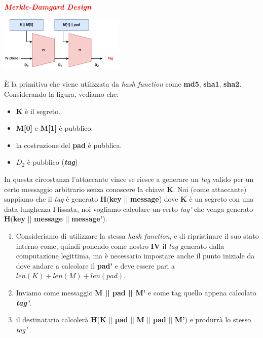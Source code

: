 \begin{boxA}
    \textcolor{red}{\textbf{\textit{Merkle-Damgard Design}}} \\

    {\centering
        \includegraphics[width=0.45\textwidth]{img/hash_md.png}
    \par}

    È la primitiva che viene utilizzata da \textit{hash function} come \textbf{md5}, \textbf{sha1}, \textbf{sha2}. Considerando la figura, vediamo che:
    \begin{itemize}[nosep]
        \item \textbf{K} è il segreto.
        \item \textbf{M[0]} e \textbf{M[1]} è pubblico.
        \item la costruzione del \textbf{pad} è pubblica.
        \item $D_2$ è pubblico (\textbf{\textit{tag}})
    \end{itemize}
    In questa circostanza l'attaccante vince se riesce a generare un \textit{tag} valido per un certo messaggio arbitrario senza conoscere la chiave \textbf{K}. Noi (come attaccante) sappiamo che il \textit{tag} è generato \textbf{H}(\textbf{key} || \textbf{message}) dove \textbf{K} è un segreto con una data lunghezza \textbf{l} fissata, noi vogliamo calcolare un certo \textit{tag'} che venga generato \textbf{H}(\textbf{key} || \textbf{message} || \textbf{message'}).
    \begin{enumerate}[nosep]
        \item Consideriamo di utilizzare la stessa \textit{hash function}, e di ripristinare il suo stato interno come, quindi ponendo come nostro \textbf{IV} il \textit{tag} generato dalla computazione legittima, ma è necessario impostare anche il punto iniziale da dove andare a calcolare il \textbf{pad'} e deve essere pari a $len(K) + len(M) + len(pad)$.
        \item Inviamo come messaggio \textbf{M || pad || M'} e come tag quello appena calcolato \textbf{\textit{tag'}}.
        \item il destinatario calcolerà \textbf{H}(\textbf{K} || \textbf{pad} || \textbf{M} || \textbf{pad} || \textbf{M'}) e produrrà lo stesso \textit{tag'} 
    \end{enumerate}
\end{boxA}

